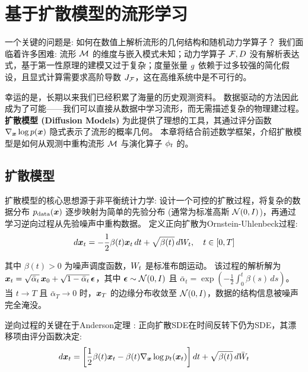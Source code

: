 \section{基于扩散模型的流形学习}
\label{sec:deep_learning}

一个关键的问题是: 如何在数值上解析流形的几何结构和随机动力学算子？
我们面临着许多困难: 流形 $\mathcal{M}$ 的维度与嵌入模式未知；动力学算子 $\mathcal{F}, D$ 没有解析表达式，基于第一性原理的建模又过于复杂；度量张量 $g$ 依赖于过多较强的简化假设，且显式计算需要求高阶导数 $J_{\mathcal{F}}$，这在高维系统中是不可行的。

幸运的是，长期以来我们已经积累了海量的历史观测资料。
数据驱动的方法因此成为了可能——我们可以直接从数据中学习流形，而无需描述复杂的物理建过程。
\textbf{扩散模型 (Diffusion Models)} 为此提供了理想的工具，其通过评分函数 $\nabla_{\bm{x}} \log p(\bm{x})$ 隐式表示了流形的概率几何。
本章将结合前述数学框架，介绍扩散模型是如何从观测中重构流形 $\mathcal{M}$ 与演化算子 $\phi_t$ 的。

\subsection{扩散模型}

扩散模型的核心思想源于非平衡统计力学: 设计一个可控的扩散过程，将复杂的数据分布 $p_{\text{data}}(\bm{x})$ 逐步映射为简单的先验分布 (通常为标准高斯 $\mathcal{N}(0, I)$)，再通过学习逆向过程从先验噪声中重构数据。
定义正向扩散为Ornstein-Uhlenbeck过程:
\begin{equation}
\label{eq:forward_diffusion}
    d\bm{x}_t = -\frac{1}{2}\beta(t)\bm{x}_t\,dt + \sqrt{\beta(t)}\,dW_t, \quad t \in [0, T]
\end{equation}

其中 $\beta(t) > 0$ 为噪声调度函数，$W_t$ 是标准布朗运动。
该过程的解析解为 $\bm{x}_t = \sqrt{\bar{\alpha}_t}\,\bm{x}_0 + \sqrt{1-\bar{\alpha}_t}\,\bm{\epsilon}$，其中 $\bm{\epsilon} \sim \mathcal{N}(0, I)$ 且 $\bar{\alpha}_t = \exp(-\frac{1}{2}\int_0^t \beta(s)\,ds)$。
当 $t \to T$ 且 $\bar{\alpha}_T \to 0$ 时，$\bm{x}_T$ 的边缘分布收敛至 $\mathcal{N}(0, I)$，数据的结构信息被噪声完全淹没。

逆向过程的关键在于Anderson定理 \cite{anderson1982reverse}: 正向扩散SDE在时间反转下仍为SDE，其漂移项由评分函数决定:
\begin{equation}
\label{eq:reverse_diffusion}
    d\bm{x}_t = \left[\frac{1}{2}\beta(t)\bm{x}_t - \beta(t)\nabla_{\bm{x}} \log p_t(\bm{x}_t)\right]dt + \sqrt{\beta(t)}\,d\bar{W}_t
\end{equation}

